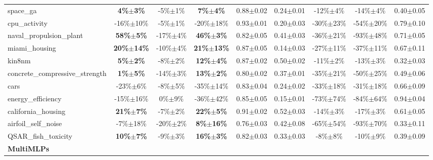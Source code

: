 \begin{table}[t]
\begin{small}
\begin{sc}
{\begin{tabular}{lcccccccc}
space\_ga  &  \textbf{4\%$\pm$3\%}  &  -5\%$\pm$1\%  &  \textbf{7\%$\pm$4\%}  &  0.88$\pm$0.02  &  0.24$\pm$0.01  &  -12\%$\pm$4\%  &  -14\%$\pm$4\%  &  0.40$\pm$0.05 \\
cpu\_activity  &  -16\%$\pm$10\%  &  -5\%$\pm$1\%  &  -20\%$\pm$18\%  &  0.93$\pm$0.01  &  0.20$\pm$0.03  &  -30\%$\pm$23\%  &  -54\%$\pm$20\%  &  0.79$\pm$0.10 \\
naval\_propulsion\_plant  &  \textbf{58\%$\pm$5\%}  &  -17\%$\pm$4\%  &  \textbf{46\%$\pm$3\%}  &  0.82$\pm$0.05  &  0.41$\pm$0.03  &  -36\%$\pm$21\%  &  -93\%$\pm$48\%  &  0.71$\pm$0.05 \\
miami\_housing  &  \textbf{20\%$\pm$14\%}  &  -10\%$\pm$4\%  &  \textbf{21\%$\pm$13\%}  &  0.87$\pm$0.05  &  0.14$\pm$0.03  &  -27\%$\pm$11\%  &  -37\%$\pm$11\%  &  0.67$\pm$0.11 \\
kin8nm  &  \textbf{5\%$\pm$2\%}  &  -8\%$\pm$2\%  &  \textbf{12\%$\pm$4\%}  &  0.87$\pm$0.02  &  0.50$\pm$0.02  &  -11\%$\pm$2\%  &  -13\%$\pm$3\%  &  0.32$\pm$0.03 \\
concrete\_compressive\_strength  &  \textbf{1\%$\pm$5\%}  &  -14\%$\pm$3\%  &  \textbf{13\%$\pm$2\%}  &  0.80$\pm$0.02  &  0.37$\pm$0.01  &  -35\%$\pm$21\%  &  -50\%$\pm$25\%  &  0.49$\pm$0.06 \\
cars  &  -23\%$\pm$6\%  &  -8\%$\pm$5\%  &  -35\%$\pm$14\%  &  0.83$\pm$0.04  &  0.24$\pm$0.02  &  -33\%$\pm$18\%  &  -31\%$\pm$18\%  &  0.66$\pm$0.09 \\
energy\_efficiency  &  -15\%$\pm$16\%  &  0\%$\pm$9\%  &  -36\%$\pm$42\%  &  0.85$\pm$0.05  &  0.15$\pm$0.01  &  -73\%$\pm$74\%  &  -84\%$\pm$64\%  &  0.94$\pm$0.04 \\
california\_housing  &  \textbf{21\%$\pm$7\%}  &  -7\%$\pm$2\%  &  \textbf{22\%$\pm$5\%}  &  0.91$\pm$0.02  &  0.52$\pm$0.03  &  -14\%$\pm$3\%  &  -17\%$\pm$3\%  &  0.61$\pm$0.05 \\
airfoil\_self\_noise  &  -7\%$\pm$18\%  &  -20\%$\pm$2\%  &  \textbf{8\%$\pm$16\%}  &  0.76$\pm$0.03  &  0.42$\pm$0.08  &  -65\%$\pm$54\%  &  -93\%$\pm$70\%  &  0.33$\pm$0.11 \\
QSAR\_fish\_toxicity  &  \textbf{10\%$\pm$7\%}  &  -9\%$\pm$3\%  &  \textbf{16\%$\pm$3\%}  &  0.82$\pm$0.03  &  0.33$\pm$0.03  &  -8\%$\pm$8\%  &  -10\%$\pm$9\%  &  0.39$\pm$0.09 \\
\cmidrule(lr){1-9}
\textbf{MultiMLPs} & & & & & & & & \\ \cmidrule(lr){1-9}


\end{tabular}}
\end{sc}
\end{small}
\end{table}
